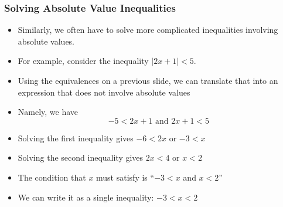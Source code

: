 \documentclass[serif,ignorenonframetext]{beamer}
\begin{document}
\begin{frame}
  \frametitle{Solving Absolute Value Inequalities}
  \begin{itemize}[<+->]
  \item Similarly, we often have to solve more complicated inequalities
    involving absolute values.
  \item For example, consider the inequality $|2x+1|<5$.
  \item Using the equivalences on a previous slide, we can translate
    that into an expression that does not involve absolute values
  \item Namely, we have
    \begin{equation*}
      \mbox{$-5<2x+1$ and $2x+1<5$}
    \end{equation*}
  \item Solving the first inequality gives $-6<2x$ or $-3<x$
  \item Solving the second inequality gives $2x<4$ or $x<2$
  \item The condition that $x$ must satisfy is ``$-3<x$ and $x<2$''
  \item We can write it as a single inequality: $-3<x<2$
  \end{itemize}
\end{frame}
\end{document}
